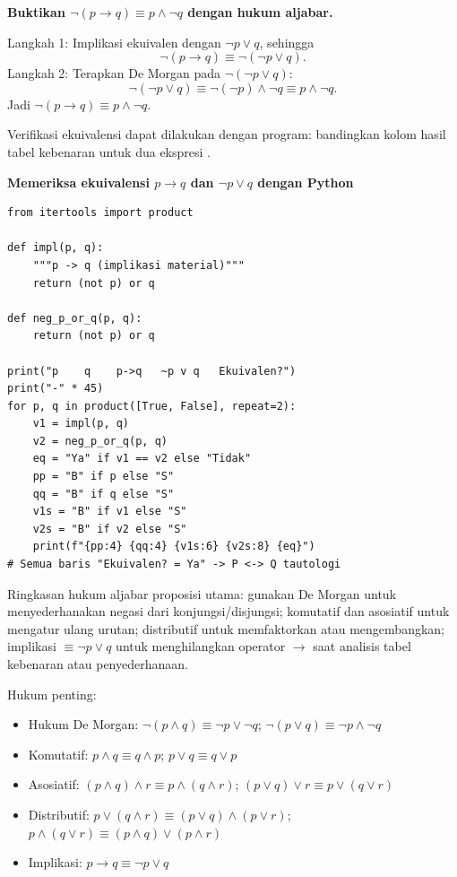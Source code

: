 \begin{contoh}
\textbf{Buktikan $\neg(p \rightarrow q) \equiv p \wedge \neg q$ dengan hukum aljabar.}

Langkah 1: Implikasi ekuivalen dengan $\neg p \vee q$, sehingga
\[
\neg(p \rightarrow q) \equiv \neg(\neg p \vee q).
\]
Langkah 2: Terapkan De Morgan pada $\neg(\neg p \vee q)$:
\[
\neg(\neg p \vee q) \equiv \neg(\neg p) \wedge \neg q \equiv p \wedge \neg q.
\]
Jadi $\neg(p \rightarrow q) \equiv p \wedge \neg q$.
\end{contoh}

Verifikasi ekuivalensi dapat dilakukan dengan program: bandingkan kolom hasil tabel kebenaran untuk dua ekspresi \cite{python_docs_boolean,levin_discrete}.

\begin{contoh}
\textbf{Memeriksa ekuivalensi $p \rightarrow q$ dan $\neg p \vee q$ dengan Python}

\begin{lstlisting}[style=pythonstyle, caption={Cek ekuivalensi dua formula dengan tabel kebenaran}]
from itertools import product

def impl(p, q):
    """p -> q (implikasi material)"""
    return (not p) or q

def neg_p_or_q(p, q):
    return (not p) or q

print("p    q    p->q   ~p v q   Ekuivalen?")
print("-" * 45)
for p, q in product([True, False], repeat=2):
    v1 = impl(p, q)
    v2 = neg_p_or_q(p, q)
    eq = "Ya" if v1 == v2 else "Tidak"
    pp = "B" if p else "S"
    qq = "B" if q else "S"
    v1s = "B" if v1 else "S"
    v2s = "B" if v2 else "S"
    print(f"{pp:4} {qq:4} {v1s:6} {v2s:8} {eq}")
# Semua baris "Ekuivalen? = Ya" -> P <-> Q tautologi
\end{lstlisting}
\end{contoh}

\begin{konsep}
Ringkasan hukum aljabar proposisi utama: gunakan De Morgan untuk menyederhanakan negasi dari konjungsi/disjungsi; komutatif dan asosiatif untuk mengatur ulang urutan; distributif untuk memfaktorkan atau mengembangkan; implikasi $\equiv \neg p \vee q$ untuk menghilangkan operator $\rightarrow$ saat analisis tabel kebenaran atau penyederhanaan.
\end{konsep}

Hukum penting:
\begin{itemize}
  \item Hukum De Morgan: $\neg(p \wedge q) \equiv \neg p \vee \neg q$; $\neg(p \vee q) \equiv \neg p \wedge \neg q$
  \item Komutatif: $p \wedge q \equiv q \wedge p$; $p \vee q \equiv q \vee p$
  \item Asosiatif: $(p \wedge q) \wedge r \equiv p \wedge (q \wedge r)$; $(p \vee q) \vee r \equiv p \vee (q \vee r)$
  \item Distributif: $p \vee (q \wedge r) \equiv (p \vee q) \wedge (p \vee r)$; $p \wedge (q \vee r) \equiv (p \wedge q) \vee (p \wedge r)$
  \item Implikasi: $p \rightarrow q \equiv \neg p \vee q$
\end{itemize}
